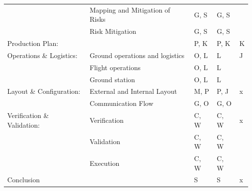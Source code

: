 \begin{longtable}[htb]{llp{1.5cm}p{1.5cm}p{1cm}}
        & Mapping and Mitigation of Risks & G, S & G, S & \\ \hdashline
        & Risk Mitigation & G, S & G, S &  \\ \hdashline
    Production Plan: & & P, K & P, K & K \\ \hdashline
    Operations \& Logistics: & Ground operations and logistics & O, L & L & J \\ \hdashline
        & Flight operations & O, L & L & \\ \hdashline
        & Ground station & O, L & L & \\ \hdashline
    Layout \& Configuration: & External and Internal Layout & M, P & P, J & x \\ \hdashline
        & Communication Flow & G, O & G, O & \\ \hdashline
    Verification \& Validation: & Verification & C, W & C, W & x \\ \hdashline
         & Validation & C, W & C, W & \\ \hdashline
         & Execution & C, W & C, W & \\ \hdashline
    Conclusion & & S & S & x \\ 
    \bottomrule 
\end{longtable}
